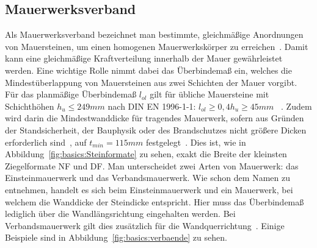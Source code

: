 \subsection{Mauerwerksverband}
\label{basics:Mauerwerksverband}
Als Mauerwerksverband bezeichnet man bestimmte, gleichmäßige Anordnungen von Mauersteinen, um einen homogenen Mauerwerkskörper zu erreichen~\cite{Mauerwer39:online}.
Damit kann eine gleichmäßige Kraftverteilung innerhalb der Mauer gewährleistet werden.
Eine wichtige Rolle nimmt dabei das Überbindemaß ein, welches die Mindestüberlappung von Mauersteinen aus zwei Schichten der Mauer vorgibt.
Für das planmäßige Überbindemaß \(l_{ol}\) gilt für übliche Mauersteine mit Schichthöhen 
\(h_{u} \leq 249 mm\) 
nach DIN EN 1996-1-1: 
\(l_{ol} \geq 0,4h_{u} \geq 45 mm\)
~\cite{Bemessun72:online}\cite{DIN_EN_1996_1_1}.
Zudem wird darin die Mindestwanddicke für tragendes Mauerwerk, \glqq{}sofern aus Gründen der Standsicherheit, der Bauphysik oder des Brandschutzes nicht größere Dicken erforderlich sind\grqq{}~\cite{Bemessun72:online}, auf 
\(t_{min} = 115 mm\) 
festgelegt~\cite{DIN_EN_1996_1_1}.
Dies ist, wie in Abbildung~\ref{fig:basics:Steinformate} zu sehen, exakt die Breite der kleinsten Ziegelformate NF und DF.
Man unterscheidet zwei Arten von Mauerwerk: das Einsteinmauerwerk und das Verbandsmauerwerk.
Wie schon dem Namen zu entnehmen, handelt es sich beim Einsteinmauerwerk und ein Mauerwerk, bei welchem die Wanddicke der Steindicke entspricht.
Hier muss das Überbindemaß lediglich über die Wandlängsrichtung eingehalten werden.
Bei Verbandsmauerwerk gilt dies zusätzlich für die Wandquerrichtung~\cite{05maurer1:online}.
Einige Beispiele sind in Abbildung~\ref{fig:basics:verbaende} zu sehen.
